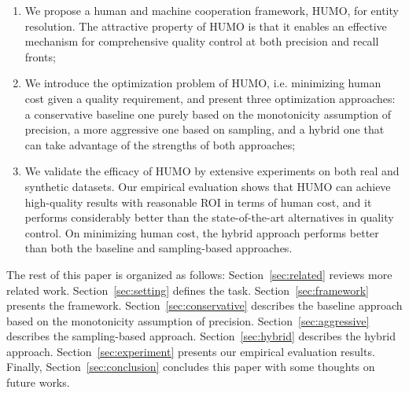 \begin{enumerate}
\item We propose a human and machine cooperation framework, HUMO, for entity resolution. The attractive property of HUMO is that it enables an effective mechanism for comprehensive quality control at both precision and recall fronts;
\item We introduce the optimization problem of HUMO, i.e. minimizing human cost given a quality requirement, and present three optimization approaches: a conservative baseline one purely based on the monotonicity assumption of precision, a more aggressive one based on sampling, and a hybrid one that can take advantage of the strengths of both approaches;
\item We validate the efficacy of HUMO by extensive experiments on both real and synthetic datasets. Our empirical evaluation shows that HUMO can achieve high-quality results with reasonable ROI in terms of human cost, and it performs considerably better than the state-of-the-art alternatives in quality control. On minimizing human cost, the hybrid approach performs better than both the baseline and sampling-based approaches.
\end{enumerate}

  The rest of this paper is organized as follows: Section~\ref{sec:related} reviews more related work. Section~\ref{sec:setting} defines the task.  Section~\ref{sec:framework} presents the framework. Section~\ref{sec:conservative} describes the baseline approach based on the monotonicity assumption of precision. Section~\ref{sec:aggressive} describes the sampling-based approach. Section~\ref{sec:hybrid} describes the hybrid approach. Section~\ref{sec:experiment} presents our empirical evaluation results.  Finally, Section~\ref{sec:conclusion} concludes this paper with some thoughts on future works.
